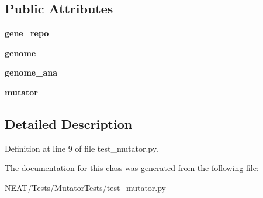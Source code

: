 \subsection*{Public Attributes}
\begin{DoxyCompactItemize}
\item 
{\bfseries gene\+\_\+repo}\hypertarget{class_n_e_a_t___py_genetics_1_1_n_e_a_t_1_1_tests_1_1_mutator_tests_1_1test__mutator_1_1_test_mutator_a752c5619c06e314c422c29039045f2ba}{}\label{class_n_e_a_t___py_genetics_1_1_n_e_a_t_1_1_tests_1_1_mutator_tests_1_1test__mutator_1_1_test_mutator_a752c5619c06e314c422c29039045f2ba}

\item 
{\bfseries genome}\hypertarget{class_n_e_a_t___py_genetics_1_1_n_e_a_t_1_1_tests_1_1_mutator_tests_1_1test__mutator_1_1_test_mutator_a9394f80639ac39245922d3fccfe6f6f1}{}\label{class_n_e_a_t___py_genetics_1_1_n_e_a_t_1_1_tests_1_1_mutator_tests_1_1test__mutator_1_1_test_mutator_a9394f80639ac39245922d3fccfe6f6f1}

\item 
{\bfseries genome\+\_\+ana}\hypertarget{class_n_e_a_t___py_genetics_1_1_n_e_a_t_1_1_tests_1_1_mutator_tests_1_1test__mutator_1_1_test_mutator_abbc943c1f4af56e4f673298fdfb9813e}{}\label{class_n_e_a_t___py_genetics_1_1_n_e_a_t_1_1_tests_1_1_mutator_tests_1_1test__mutator_1_1_test_mutator_abbc943c1f4af56e4f673298fdfb9813e}

\item 
{\bfseries mutator}\hypertarget{class_n_e_a_t___py_genetics_1_1_n_e_a_t_1_1_tests_1_1_mutator_tests_1_1test__mutator_1_1_test_mutator_aedbc8dd48af66b1508bd9fb60d59f76c}{}\label{class_n_e_a_t___py_genetics_1_1_n_e_a_t_1_1_tests_1_1_mutator_tests_1_1test__mutator_1_1_test_mutator_aedbc8dd48af66b1508bd9fb60d59f76c}

\end{DoxyCompactItemize}


\subsection{Detailed Description}


Definition at line 9 of file test\+\_\+mutator.\+py.



The documentation for this class was generated from the following file\+:\begin{DoxyCompactItemize}
\item 
N\+E\+A\+T/\+Tests/\+Mutator\+Tests/test\+\_\+mutator.\+py\end{DoxyCompactItemize}
